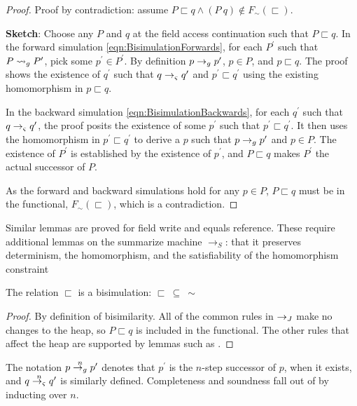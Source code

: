 \begin{proof}
Proof by contradiction: assume $P \sqsubset q \wedge (P\ q) \not\in F_\sim(\sqsubset)$.

\noindent\textbf{Sketch}: Choose any $P$ and $q$ at the field access continuation such
that $P \sqsubset q$. In the forward simulation
\eqref{eqn:BisimulationForwards}, for each $P^\prime$ such that $P
\leadsto_{g} P^\prime$, pick some $p^\prime \in P^\prime$. By definition $p \rightarrow_{g}
p^\prime$, $p \in P$, and $p \sqsubset q$. The proof shows the
existence of $q^\prime$ such that $q \rightarrow_{\varsigma} q^\prime$ and $p^\prime
\sqsubset q^\prime$ using the existing homomorphism in $p \sqsubset q$.

In the backward simulation \eqref{eqn:BisimulationBackwards}, for each
$q^\prime$ such that $q \rightarrow_{\varsigma} q^\prime$, the proof posits the existence of some 
$p^\prime$ such that $p^\prime \sqsubset q^\prime$. It then uses the
homomorphism in $p^\prime \sqsubset q^\prime$ to derive a $p$ such
that $p \rightarrow_{g} p^\prime$ and $p \in P$. The existence of $P^\prime$ is established by the existence of $p^\prime$, and $P \sqsubset q$ makes $P^\prime$ the actual successor of $P$.

As the forward and backward simulations hold for any $p \in P$, $P
\sqsubset q$ must be in the functional, $F_\sim(\sqsubset)$, which is
a contradiction.
\end{proof}

Similar lemmas are proved for field write and equals reference. These
require additional lemmas on the summarize machine
$\rightarrow_S$: that it preserves determinism, the
homomorphism, and the satisfiability of the homomorphism constraint

\begin{theorem}
\label{th:bisim}
The relation $\sqsubset$ is a bisimulation: $\sqsubset\ \subseteq\ \sim$
\end{theorem}
\begin{proof}
By definition of bisimilarity. All of the common rules in $\rightarrow_{J}$
make no changes to the heap, so $P \sqsubset q$ is included in the
functional. The other rules that affect the heap are supported by lemmas
such as .
\end{proof}

The notation $p \stackrel{n}{\rightarrow_{g}} p^\prime$ denotes that $p^\prime$
is the $n$-step successor of $p$, when it exists, and $q
\stackrel{n}{\rightarrow_{\varsigma}} q^\prime$ is similarly defined. Completeness and
soundness fall out of  by inducting
over $n$. 


